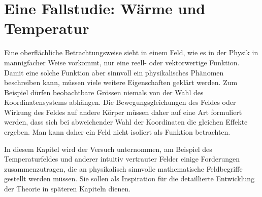 %
%
%
\chapter{Eine Fallstudie: Wärme und Temperatur
\label{chapter:fallstudie}}

\noindent
Eine oberflächliche Betrachtungsweise sieht in einem Feld, wie es in
der Physik in mannigfacher Weise vorkommt, nur eine reell- oder
vektorwertige Funktion.
Damit eine solche Funktion aber sinnvoll ein physikalisches Phänomen
beschreiben kann, müssen viele weitere Eigenschaften geklärt werden.
Zum Beispiel dürfen beobachtbare Grössen niemals von der Wahl des
Koordinatensystems abhängen.
Die Bewegungsgleichungen des Feldes oder Wirkung des Feldes auf
andere Körper müssen daher auf eine Art formuliert werden, dass sich
bei abweichender Wahl der Koordinaten die gleichen Effekte ergeben.
Man kann daher ein Feld nicht isoliert als Funktion betrachten.

In diesem Kapitel wird der Versuch unternommen, am Beispiel des
Temperaturfeldes und anderer intuitiv vertrauter Felder einige
Forderungen zusammenzutragen, die an physikalisch sinnvolle mathematische
Feldbegriffe gestellt werden müssen.
Sie sollen als Inspiration für die detaillierte Entwicklung der
Theorie in späteren Kapiteln dienen.






